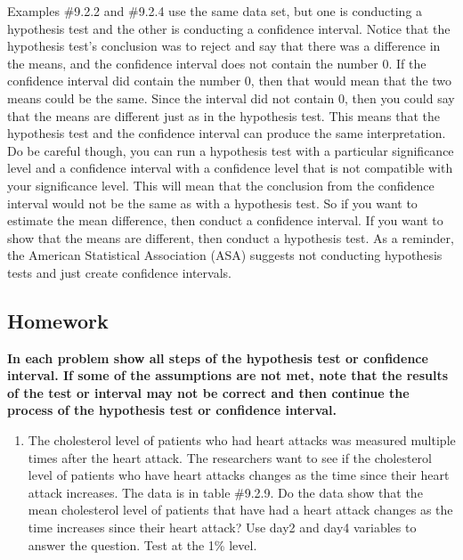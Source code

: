 \documentclass[]{book}
\providecommand{\tightlist}{%
  \setlength{\itemsep}{0pt}\setlength{\parskip}{0pt}}
\begin{document}
Examples \#9.2.2 and \#9.2.4 use the same data set, but one is conducting a hypothesis test and the other is conducting a confidence interval. Notice that the hypothesis test's conclusion was to reject and say that there was a difference in the means, and the confidence interval does not contain the number 0. If the confidence interval did contain the number 0, then that would mean that the two means could be the same. Since the interval did not contain 0, then you could say that the means are different just as in the hypothesis test. This means that the hypothesis test and the confidence interval can produce the same interpretation. Do be careful though, you can run a hypothesis test with a particular significance level and a confidence interval with a confidence level that is not compatible with your significance level. This will mean that the conclusion from the confidence interval would not be the same as with a hypothesis test. So if you want to estimate the mean difference, then conduct a confidence interval. If you want to show that the means are different, then conduct a hypothesis test. As a reminder, the American Statistical Association (ASA) suggests not conducting hypothesis tests and just create confidence intervals.

\hypertarget{homework-27}{%
\subsection{Homework}\label{homework-27}}

\textbf{In each problem show all steps of the hypothesis test or confidence interval. If some of the assumptions are not met, note that the results of the test or interval may not be correct and then continue the process of the hypothesis test or confidence interval.}

\begin{enumerate}
\def\labelenumi{\arabic{enumi}.}
\tightlist
\item
  The cholesterol level of patients who had heart attacks was measured multiple times after the heart attack. The researchers want to see if the cholesterol level of patients who have heart attacks changes as the time since their heart attack increases. The data is in table \#9.2.9. Do the data show that the mean cholesterol level of patients that have had a heart attack changes as the time increases since their heart attack? Use day2 and day4 variables to answer the question. Test at the 1\% level.
\end{enumerate}
\end{document}
